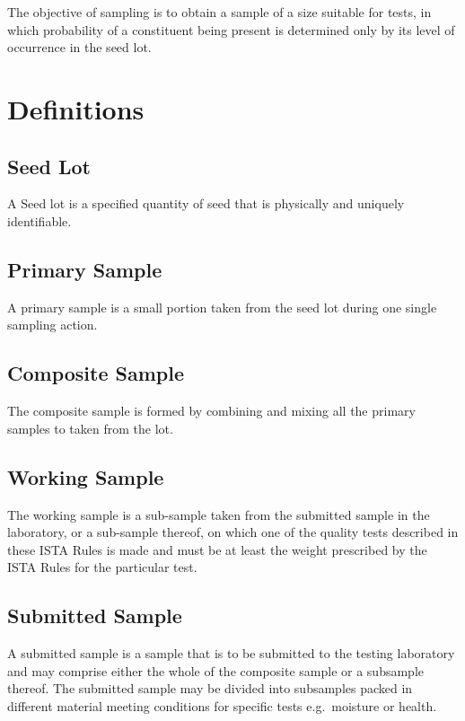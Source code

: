 \documentclass[]{book}
\begin{document}
The objective of sampling is to obtain a sample of a size suitable for
tests, in which probability of a constituent being present is determined
only by its level of occurrence in the seed lot.

\section{Definitions}\label{definitions}

\subsection{Seed Lot}\label{seed-lot}

A Seed lot is a specified quantity of seed that is physically and
uniquely identifiable.

\subsection{Primary Sample}\label{primary-sample}

A primary sample is a small portion taken from the seed lot during one
single sampling action.

\subsection{Composite Sample}\label{composite-sample}

The composite sample is formed by combining and mixing all the primary
samples to taken from the lot.

\subsection{Working Sample}\label{working-sample}

The working sample is a sub-sample taken from the submitted sample in
the laboratory, or a sub-sample thereof, on which one of the quality
tests described in these ISTA Rules is made and must be at least the
weight prescribed by the ISTA Rules for the particular test.

\subsection{Submitted Sample}\label{submitted-sample}

A submitted sample is a sample that is to be submitted to the testing
laboratory and may comprise either the whole of the composite sample or
a subsample thereof. The submitted sample may be divided into subsamples
packed in different material meeting conditions for specific tests
e.g.~moisture or health.
\end{document}
